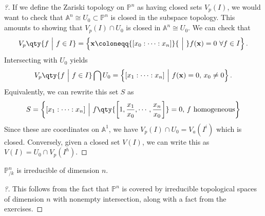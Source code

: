 \begin{proof}[?]

If we define the Zariski topology on \({\mathbb{P}}^n\) as having closed
sets \(V_p(I)\), we would want to check that
\({\mathbb{A}}^n\cong U_0 \subset {\mathbb{P}}^n\) is closed in the
subspace topology. This amounts to showing that \(V_p(I) \cap U_0\) is
closed in \({\mathbb{A}}^n \cong U_0\). We can check that
\begin{align*}  
V_p\qty{f {~\mathrel{\Big|}~}f\in I} = \left\{{\mathbf{x} \coloneqq{\left[ {x_0:\cdots:x_n} \right]} {~\mathrel{\Big|}~}f(\mathbf{x}) = 0 \,\, \forall f\in I}\right\}
.\end{align*}
Intersecting with \(U_0\) yields
\begin{align*}  
V_p\qty{f{~\mathrel{\Big|}~}f\in I} \bigcap U_0 = \left\{{{\left[ {x_1:\cdots:x_n} \right]} {~\mathrel{\Big|}~}f(\mathbf{x}) = 0,\, x_0\neq 0}\right\}
.\end{align*}
Equivalently, we can rewrite this set \(S\) as
\begin{align*}
S = \left\{{{\left[ {x_1:\cdots:x_n} \right]} {~\mathrel{\Big|}~}f\qty{{\left[ {1, {x_1 \over x_0}, \cdots,{x_n \over x_0} } \right]}} = 0,\, f \text{ homogeneous}}\right\}
\end{align*}
Since these are coordinates on \({\mathbb{A}}^1\), we have
\(V_p(I) \cap U_0 = V_a(I^i)\) which is closed. Conversely, given a
closed set \(V(I)\), we can write this as \(V(I) = U_0 \cap V_p(I^h)\).

\end{proof}

\begin{corollary}

\({\mathbb{P}}^n_{/k}\) is irreducible of dimension \(n\).

\end{corollary}

\begin{proof}[?]

This follows from the fact that \({\mathbb{P}}^n\) is covered by
irreducible topological spaces of dimension \(n\) with nonempty
intersection, along with a fact from the exercises.

\end{proof}

